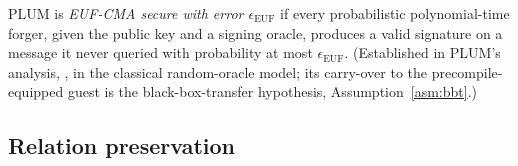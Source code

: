 \begin{definition}\label{def:euf}
PLUM is \emph{EUF-CMA secure with error $\epsilon_{\mathrm{EUF}}$} if every probabilistic polynomial-time forger, given the public key and a signing oracle, produces a valid signature on a message it never queried with probability at most $\epsilon_{\mathrm{EUF}}$. (Established in PLUM's analysis, \cite[Theorem~1]{10.1007/978-981-95-2961-2_6}, in the classical random-oracle model; its carry-over to the precompile-equipped guest is the black-box-transfer hypothesis, Assumption~\ref{asm:bbt}.)
\end{definition}

\subsection{Relation preservation}\label{app:prsv-relation}
